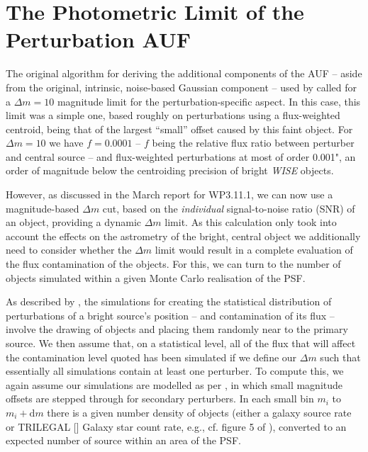 \documentclass[fleqn,usenatbib]{mnras}
\begin{document}
\section{The Photometric Limit of the Perturbation AUF}
\label{sec:photolimits}
The original algorithm for deriving the additional components of the AUF -- aside from the original, intrinsic, noise-based Gaussian component -- used by \citet{2018MNRAS.481.2148W} called for a $\Delta m = 10$ magnitude limit for the perturbation-specific aspect.
In this case, this limit was a simple one, based roughly on perturbations using a flux-weighted centroid, being that of the largest ``small'' offset caused by this faint object.
For $\Delta m = 10$ we have $f = 0.0001$ -- $f$ being the relative flux ratio between perturber and central source -- and flux-weighted perturbations at most of order 0.001", an order of magnitude below the centroiding precision of bright \textit{WISE} objects.

However, as discussed in the March report for WP3.11.1, we can now use a magnitude-based $\Delta m$ cut, based on the \textit{individual} signal-to-noise ratio (SNR) of an object, providing a dynamic $\Delta m$ limit.
As this calculation only took into account the effects on the astrometry of the bright, central object we additionally need to consider whether the $\Delta m$ limit would result in a complete evaluation of the flux contamination of the objects.
For this, we can turn to the number of objects simulated within a given Monte Carlo realisation of the PSF.

As described by \citet{2018MNRAS.481.2148W}, the simulations for creating the statistical distribution of perturbations of a bright source's position -- and contamination of its flux -- involve the drawing of objects and placing them randomly near to the primary source.
We then assume that, on a statistical level, all of the flux that will affect the contamination level quoted has been simulated if we define our $\Delta m$ such that essentially all simulations contain at least one perturber.
To compute this, we again assume our simulations are modelled as per \citet{2018MNRAS.481.2148W}, in which small magnitude offsets are stepped through for secondary perturbers.
In each small bin $m_i$ to $m_i + \mathrm{d}m$ there is a given number density of objects (either a galaxy source rate or TRILEGAL [\citealp{Girardi2005}] Galaxy star count rate, e.g., cf. figure 5 of \citealp{2018MNRAS.481.2148W}), converted to an expected number of source within an area of the PSF.
\end{document}
